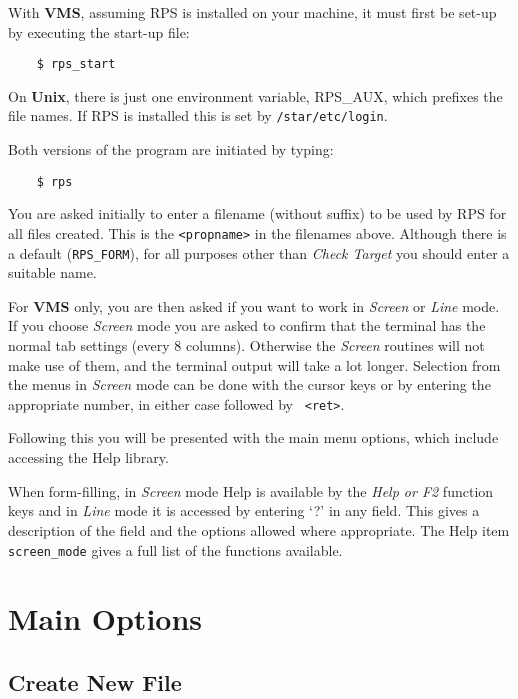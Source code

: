 With {\bf VMS}, assuming RPS is installed on your machine, it must
first be set-up by executing the start-up file:

\begin{verbatim}
    $ rps_start
\end{verbatim}

On {\bf Unix}, there is just one environment variable, RPS\_AUX, which
prefixes the file names. If RPS is installed this is set by
{\tt /star/etc/login}.

Both versions of the program are initiated by typing:

\begin{verbatim}
    $ rps
\end{verbatim}

You are asked initially to enter a filename (without suffix) to be used
by RPS for all files created. This is the \verb+<propname>+ in the
filenames above.  Although there is a default ({\tt RPS\_FORM}), for all
purposes other than {\em Check Target} you should enter a suitable
name.

For {\bf VMS} only, you are then asked if you want to work in {\em
Screen} or {\em Line} mode. If you choose {\em Screen} mode you are
asked to confirm that the terminal has the normal tab settings (every 8
columns). Otherwise the {\em Screen} routines will not make use of
them, and the terminal output will take a lot longer.  Selection from
the menus in {\em Screen} mode can be done with the cursor keys or by
entering the appropriate number, in either case followed by {\tt
<ret>}.

Following this you will be presented with the main menu options, which
include accessing the Help library.

When form-filling, in {\em Screen} mode Help is available by the {\em
Help {\rm or} F2} function keys and in {\em Line} mode it is accessed
by entering `?' in any field.  This gives a description of the field
and the options allowed where appropriate.  The Help item {\tt
screen\_mode} gives a full list of the functions available.

\section{Main Options}

\subsection {Create New File}

